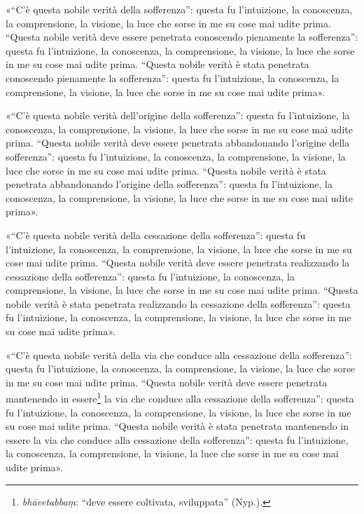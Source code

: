 «“C’è questa nobile verità della sofferenza”: questa fu l’intuizione, la
conoscenza, la comprensione, la visione, la luce che sorse in me su cose mai
udite prima. “Questa nobile verità deve essere penetrata conoscendo pienamente
la sofferenza”: questa fu l’intuizione, la conoscenza, la comprensione, la
visione, la luce che sorse in me su cose mai udite prima. “Questa nobile verità
è stata penetrata conoscendo pienamente la sofferenza”: questa fu l’intuizione,
la conoscenza, la comprensione, la visione, la luce che sorse in me su cose mai
udite prima».

«“C’è questa nobile verità dell’origine della sofferenza”: questa fu
l’intuizione, la conoscenza, la comprensione, la visione, la luce che sorse in
me su cose mai udite prima. “Questa nobile verità deve essere penetrata
abbandonando l’origine della sofferenza”: questa fu l’intuizione, la conoscenza,
la comprensione, la visione, la luce che sorse in me su cose mai udite prima.
“Questa nobile verità è stata penetrata abbandonando l’origine della
sofferenza”: questa fu l’intuizione, la conoscenza, la comprensione, la visione,
la luce che sorse in me su cose mai udite prima».

«“C’è questa nobile verità della cessazione della sofferenza”: questa fu
l’intuizione, la conoscenza, la comprensione, la visione, la luce che sorse in
me su cose mai udite prima. “Questa nobile verità deve essere penetrata
realizzando la cessazione della sofferenza”: questa fu l’intuizione, la
conoscenza, la comprensione, la visione, la luce che sorse in me su cose mai
udite prima. “Questa nobile verità è stata penetrata realizzando la cessazione
della sofferenza”: questa fu l’intuizione, la conoscenza, la comprensione, la
visione, la luce che sorse in me su cose mai udite prima».

«“C’è questa nobile verità della via che conduce alla cessazione della
sofferenza”: questa fu l’intuizione, la conoscenza, la comprensione, la visione,
la luce che sorse in me su cose mai udite prima. “Questa nobile verità deve
essere penetrata mantenendo in essere\footnote{\emph{bhāvetabbaṃ}: “deve essere
  coltivata, sviluppata” (Nyp.).} la via che conduce alla cessazione della
sofferenza”: questa fu l’intuizione, la conoscenza, la comprensione, la visione,
la luce che sorse in me su cose mai udite prima. “Questa nobile verità è stata
penetrata mantenendo in essere la via che conduce alla cessazione della
sofferenza”: questa fu l’intuizione, la conoscenza, la comprensione, la visione,
la luce che sorse in me su cose mai udite prima».


